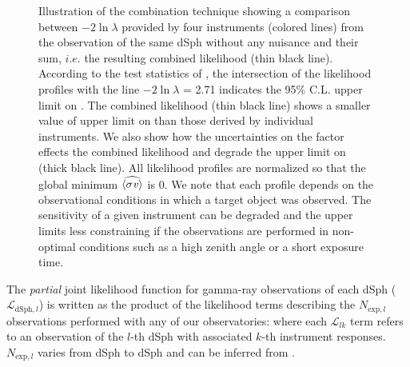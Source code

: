 \begin{figure}[t]
    \caption{Illustration of the combination technique showing a comparison between $-2\ln  \lambda$ provided by four instruments (colored lines) from the observation of the same dSph without any \J nuisance and their sum, $i.e.$ the resulting combined likelihood (thin black line). According to the test statistics of , the intersection of the likelihood profiles with the line $-2\ln  \lambda$ = 2.71 indicates the 95\% C.L. upper limit on \sv. The combined likelihood (thin black line) shows a smaller value of upper limit on \sv than those derived by individual instruments. We also show how the uncertainties on the \J factor effects the combined likelihood and degrade the upper limit on \sv (thick black line). All likelihood profiles are normalized so that the global minimum $\widehat{\langle \sigma \mathit{v} \rangle}$ is 0. We note that each profile depends on the observational conditions in which a target object was observed. The sensitivity of a given instrument can be degraded and the upper limits less constraining if the observations are performed in non-optimal conditions such as a high zenith angle or a short exposure time.}
    \label{fig:illustration_combination}
\end{figure}

The \textit{partial} joint likelihood function for gamma-ray observations of each dSph ($\mathcal{L}_{\text{dSph},l}$) is written as the product of the likelihood terms describing the $N_{\mathrm{exp},l}$ observations performed with any of our observatories:
\GDjointLLH
where each $\mathcal{L}_{lk}$ term refers to an observation of the $l$-th dSph with associated $k$-th instrument responses.
$ N_{\mathrm{exp},l} $ varies from dSph to dSph and can be inferred from .

